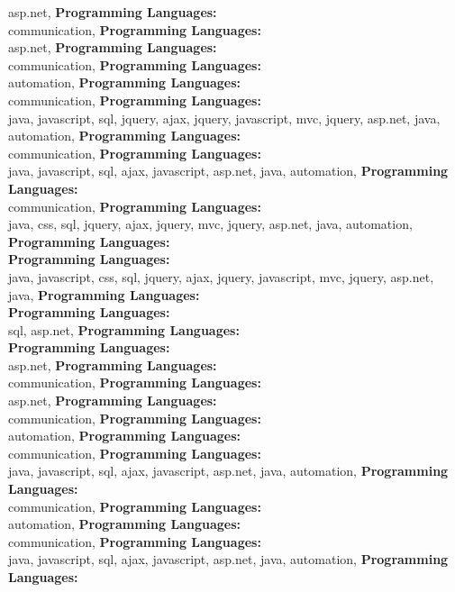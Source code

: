 asp.net, \textbf{Programming Languages:} \\
communication, \textbf{Programming Languages:} \\
asp.net, \textbf{Programming Languages:} \\
communication, \textbf{Programming Languages:} \\
automation, \textbf{Programming Languages:} \\
communication, \textbf{Programming Languages:} \\
java, javascript, sql, jquery, ajax,  jquery, javascript, mvc, jquery, asp.net, java, automation, \textbf{Programming Languages:} \\
communication, \textbf{Programming Languages:} \\
java, javascript, sql, ajax, javascript, asp.net, java, automation, \textbf{Programming Languages:} \\
communication, \textbf{Programming Languages:} \\
java, css, sql, jquery, ajax,  jquery, mvc, jquery, asp.net, java, automation, \textbf{Programming Languages:} \\
\textbf{Programming Languages:} \\
java, javascript, css, sql, jquery, ajax,  jquery, javascript, mvc, jquery, asp.net, java, \textbf{Programming Languages:} \\
\textbf{Programming Languages:} \\
sql, asp.net, \textbf{Programming Languages:} \\
\textbf{Programming Languages:} \\
asp.net, \textbf{Programming Languages:} \\
communication, \textbf{Programming Languages:} \\
asp.net, \textbf{Programming Languages:} \\
communication, \textbf{Programming Languages:} \\
automation, \textbf{Programming Languages:} \\
communication, \textbf{Programming Languages:} \\
java, javascript, sql, ajax, javascript, asp.net, java, automation, \textbf{Programming Languages:} \\
communication, \textbf{Programming Languages:} \\
automation, \textbf{Programming Languages:} \\
communication, \textbf{Programming Languages:} \\
java, javascript, sql, ajax, javascript, asp.net, java, automation, \textbf{Programming Languages:} \\
